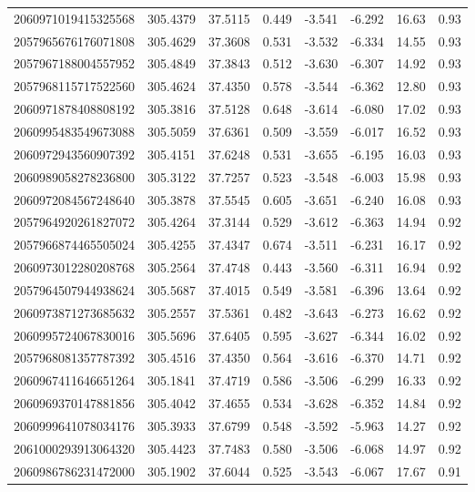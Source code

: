 \begin{longtable}{lccccccc}
2060971019415325568 & 305.4379 & 37.5115 & 0.449 & -3.541 & -6.292 & 16.63 & 0.93 \\
2057965676176071808 & 305.4629 & 37.3608 & 0.531 & -3.532 & -6.334 & 14.55 & 0.93 \\
2057967188004557952 & 305.4849 & 37.3843 & 0.512 & -3.630 & -6.307 & 14.92 & 0.93 \\
2057968115717522560 & 305.4624 & 37.4350 & 0.578 & -3.544 & -6.362 & 12.80 & 0.93 \\
2060971878408808192 & 305.3816 & 37.5128 & 0.648 & -3.614 & -6.080 & 17.02 & 0.93 \\
2060995483549673088 & 305.5059 & 37.6361 & 0.509 & -3.559 & -6.017 & 16.52 & 0.93 \\
2060972943560907392 & 305.4151 & 37.6248 & 0.531 & -3.655 & -6.195 & 16.03 & 0.93 \\
2060989058278236800 & 305.3122 & 37.7257 & 0.523 & -3.548 & -6.003 & 15.98 & 0.93 \\
2060972084567248640 & 305.3878 & 37.5545 & 0.605 & -3.651 & -6.240 & 16.08 & 0.93 \\
2057964920261827072 & 305.4264 & 37.3144 & 0.529 & -3.612 & -6.363 & 14.94 & 0.92 \\
2057966874465505024 & 305.4255 & 37.4347 & 0.674 & -3.511 & -6.231 & 16.17 & 0.92 \\
2060973012280208768 & 305.2564 & 37.4748 & 0.443 & -3.560 & -6.311 & 16.94 & 0.92 \\
2057964507944938624 & 305.5687 & 37.4015 & 0.549 & -3.581 & -6.396 & 13.64 & 0.92 \\
2060973871273685632 & 305.2557 & 37.5361 & 0.482 & -3.643 & -6.273 & 16.62 & 0.92 \\
2060995724067830016 & 305.5696 & 37.6405 & 0.595 & -3.627 & -6.344 & 16.02 & 0.92 \\
2057968081357787392 & 305.4516 & 37.4350 & 0.564 & -3.616 & -6.370 & 14.71 & 0.92 \\
2060967411646651264 & 305.1841 & 37.4719 & 0.586 & -3.506 & -6.299 & 16.33 & 0.92 \\
2060969370147881856 & 305.4042 & 37.4655 & 0.534 & -3.628 & -6.352 & 14.84 & 0.92 \\
2060999641078034176 & 305.3933 & 37.6799 & 0.548 & -3.592 & -5.963 & 14.27 & 0.92 \\
2061000293913064320 & 305.4423 & 37.7483 & 0.580 & -3.506 & -6.068 & 14.97 & 0.92 \\
2060986786231472000 & 305.1902 & 37.6044 & 0.525 & -3.543 & -6.067 & 17.67 & 0.91 \\

\end{longtable}
